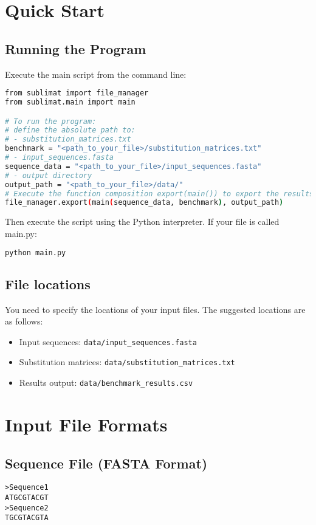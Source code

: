 \documentclass{article}
\begin{document}
\section{Quick Start}
\subsection{Running the Program}
Execute the main script from the command line:
\begin{lstlisting}[language=bash]
from sublimat import file_manager
from sublimat.main import main

# To run the program:
# define the absolute path to:
# - substitution_matrices.txt
benchmark = "<path_to_your_file>/substitution_matrices.txt"
# - input_sequences.fasta
sequence_data = "<path_to_your_file>/input_sequences.fasta"
# - output directory
output_path = "<path_to_your_file>/data/"
# Execute the function composition export(main()) to export the results to the output directory
file_manager.export(main(sequence_data, benchmark), output_path)

\end{lstlisting}

Then execute the script using the Python interpreter. If your file is called main.py:

\begin{lstlisting}[language=bash]
    python main.py
\end{lstlisting}

\subsection{File locations}
You need to specify the locations of your input files. The suggested locations are as follows:
\begin{itemize}
\item Input sequences: \texttt{data/input\_sequences.fasta}
\item Substitution matrices: \texttt{data/substitution\_matrices.txt}
\item Results output: \texttt{data/benchmark\_results.csv}
\end{itemize}

\section{Input File Formats}
\subsection{Sequence File (FASTA Format)}
\begin{lstlisting}
>Sequence1
ATGCGTACGT
>Sequence2
TGCGTACGTA
\end{lstlisting}
\end{document}
